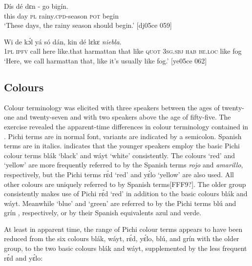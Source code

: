 \ea%
    \label{ex:key:1749}
    \gll Dís  dé  dɛn  -    go  bigín.\\
this  day  \textsc{pl}  rainy.\textsc{cpd}{}-season  \textsc{pot}  begin\\

\glt ‘These days, the rainy season should begin.’ [dj05ce 059]
\z


\ea
\label{ex:key:1750}
\gll
  Wi  de  kɔ́l  yá    só        dán,    
 kin  dé    lɛkɛ  \textit{niebla}.\\
\textsc{1pl}  \textsc{ipfv}  call  here    like.that  harmattan  that    like  \textsc{quot}
\textsc{3sg.sbj}  \textsc{hab}  \textsc{be.loc}  like  fog \\
\glt ‘Here, we call harmattan that, like it’s usually like fog.’ [ye05ce 062]
\z

\subsection{Colours}

Colour terminology was elicited with three speakers between the ages of twenty-one and twenty-seven and with two speakers above the age of fifty-five. The exercise revealed the apparent-time differences in colour terminology contained in . Pichi terms are in normal font, variants are indicated by a semicolon. Spanish terms are in italics.  indicates that the younger speakers employ the basic Pichi colour terms blák ‘black’ and wáyt ‘white’ consistently. The colours ‘red’ and ‘yellow’ are more frequently referred to by the Spanish terms \textit{rojo} and \textit{amarillo}, respectively, but the Pichi terms rɛ́d ‘red’ and yɛ́lo ‘yellow’ are also used. All other colours are uniquely referred to by Spanish terms[FFF9?]. The older group consistently makes use of Pichi rɛ́d ‘red’ in addition to the basic colours blák and wáyt. Meanwhile ‘blue’ and ‘green’ are referred to by the Pichi terms blú and grín , respectively, or by their Spanish equivalents azul and verde. 


At least in apparent time, the range of Pichi colour terms appears to have been reduced from the six colours blák, wáyt, rɛ́d, yɛ́lo, blú, and grín with the older group, to the two basic colours blák and wáyt, supplemented by the less frequent rɛ́d and yɛ́lo: 


